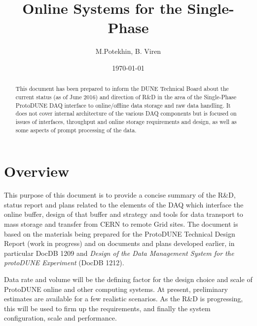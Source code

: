 \documentclass[pdftex,12pt,letter]{article}
\title{Online Systems for the Single-Phase \pd}
\date{\today}
\author{M.Potekhin, B. Viren}
\newcommand{\pd}{ProtoDUNE\xspace}
\begin{document}

\maketitle

\begin{abstract}
\noindent This document has been prepared to inform the DUNE Technical Board about the current status
(as of June 2016) and direction of R\&D in the area of the Single-Phase \pd DAQ interface to online/offline data storage
and raw data handling. It does not cover internal architecture of the various DAQ components but is focused on
issues of interfaces, throughput and online storage requirements and design, as well as some aspects of prompt
processing of the data.
\end{abstract}

\tableofcontents

\pagebreak

\section{Overview}

This purpose of this document is to provide a concise summary of
the R\&D, status report and plans related to the elements of the DAQ which interface
the online buffer, design of that buffer and strategy and tools
for data transport to mass storage and transfer from CERN to remote Grid sites.
The document is based on the materials being prepared for the \pd Technical Design Report  (work in progress)
and on documents and plans developed earlier, in particular DocDB 1209 and \textit{Design of
the Data Management System for the protoDUNE Experiment} (DocDB 1212).

Data rate and volume will be the defining factor for the design choice and scale of \pd online and other computing systems.
At present, preliminary estimates are available for a few realistic scenarios. As the R\&D is progressing, this will
be used to firm up the requirements, and finally the system configuration, scale and performance.
\end{document}
